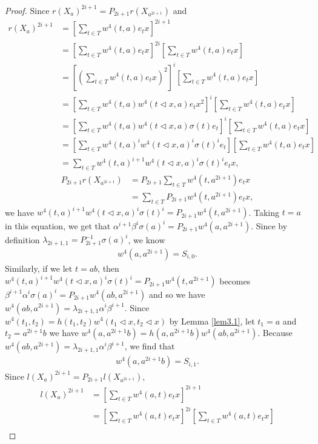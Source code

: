 \documentclass[a4paper,11pt]{amsart}
\numberwithin{equation}{section}
\begin{document}
\begin{proof}
Since $r(X_a)^{2i+1}=P_{2i+1}r(X_{a^{2i+1}})$ and
\begin{align*}
r(X_a)^{2i+1}&=[\sum_{t\in T} w^4(t,a)e_t x]^{2i+1}\\
&=[\sum_{t\in T} w^4(t,a)e_t x]^{2i}[\sum_{t\in T} w^4(t,a)e_t x]\\
&=[(\sum_{t\in T} w^4(t,a)e_t x)^2]^{i} [\sum_{t\in T} w^4(t,a)e_t x]\\
&=[\sum_{t\in T} w^4(t,a) w^4(t\triangleleft x,a)e_t x^2]^{i} [\sum_{t\in T} w^4(t,a)e_t x]\\
&=[\sum_{t\in T} w^4(t,a) w^4(t\triangleleft x,a) \sigma(t)e_t]^{i} [\sum_{t\in T} w^4(t,a)e_t x]\\
&=[\sum_{t\in T} w^4(t,a)^i w^4(t\triangleleft x,a)^i \sigma(t)^i e_t] [\sum_{t\in T} w^4(t,a)e_t x]\\
&=\sum_{t\in T} w^4(t,a)^{i+1} w^4(t\triangleleft x,a)^i \sigma(t)^i e_t x,
\end{align*}
\begin{align*}
P_{2i+1}r(X_{a^{2i+1}})&=P_{2i+1} \sum_{t\in T} w^4(t,a^{2i+1})e_t x\\
&=\sum_{t\in T}P_{2i+1} w^4(t,a^{2i+1})e_t x,
\end{align*}
we have $w^4(t,a)^{i+1} w^4(t\triangleleft x,a)^i \sigma(t)^i=P_{2i+1} w^4(t,a^{2i+1})$. Taking $t=a$ in this equation, we get that $\alpha^{i+1} \beta^i \sigma(a)^i=P_{2i+1} w^4(a,a^{2i+1})$. Since by definition $\lambda_{2i+1,1}=P_{2i+1}^{-1} \sigma(a)^i$, we know
\begin{align}
\label{temp3} w^4(a,a^{2i+1})=S_{i,0}.
\end{align}
Similarly, if we let $t=ab$, then $w^4(t,a)^{i+1} w^4(t\triangleleft x,a)^i \sigma(t)^i=P_{2i+1} w^4(t,a^{2i+1})$ becomes $\beta^{i+1} \alpha^i \sigma(a)^i=P_{2i+1} w^4(ab,a^{2i+1})$ and so we have $w^4(ab,a^{2i+1})=\lambda_{2i+1,1} \alpha^i \beta^{i+1}$. Since $w^4(t_1,t_2)=h(t_1,t_2)w^4(t_1\triangleleft x,t_2\triangleleft x)$ by Lemma \ref{lem3.1},  let $t_1=a$ and $t_2=a^{2i+1}b$ we have $w^4(a,a^{2i+1}b)=h(a,a^{2i+1}b)w^4(ab,a^{2i+1})$. Because $w^4(ab,a^{2i+1})=\lambda_{2i+1,1} \alpha^i \beta^{i+1}$, we find that
\begin{align}
\label{temp4} w^4(a,a^{2i+1}b)=S_{i,1}.
\end{align}
Since $l(X_a)^{2i+1}=P_{2i+1}l(X_{a^{2i+1}})$,
\begin{align*}
l(X_a)^{2i+1}&=[\sum_{t\in T} w^4(a,t)e_t x]^{2i+1}\\
&=[\sum_{t\in T} w^4(a,t)e_t x]^{2i}[\sum_{t\in T} w^4(a,t)e_t x]\\

\end{align*}
\end{proof}
\end{document}
